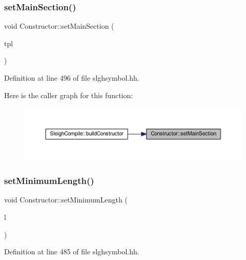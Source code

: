 \subsubsection{\texorpdfstring{setMainSection()}{setMainSection()}}
{\footnotesize\ttfamily void Constructor\+::set\+Main\+Section (\begin{DoxyParamCaption}\item[{\mbox{\hyperlink{class_construct_tpl}{Construct\+Tpl}} $\ast$}]{tpl }\end{DoxyParamCaption})\hspace{0.3cm}{\ttfamily [inline]}}



Definition at line 496 of file slghsymbol.\+hh.

Here is the caller graph for this function\+:
\nopagebreak
\begin{figure}[H]
\begin{center}
\leavevmode
\includegraphics[width=350pt]{class_constructor_ab57dc6ff30aa37f1bc63d156edb42ae6_icgraph}
\end{center}
\end{figure}
\mbox{\label{class_constructor_a83b3646b2ab617b9a424c8d0ae3383f1}} 
\subsubsection{\texorpdfstring{setMinimumLength()}{setMinimumLength()}}
{\footnotesize\ttfamily void Constructor\+::set\+Minimum\+Length (\begin{DoxyParamCaption}\item[{int4}]{l }\end{DoxyParamCaption})\hspace{0.3cm}{\ttfamily [inline]}}



Definition at line 485 of file slghsymbol.\+hh.

\mbox{\label{class_constructor_a138cd50d73a4b5475b0ca28ed682f381}} 
